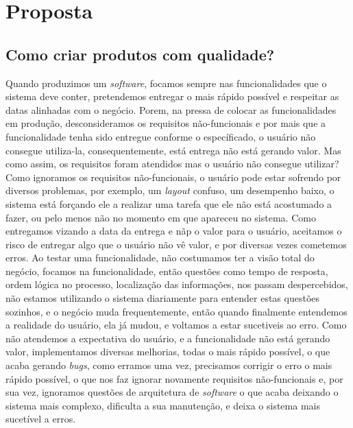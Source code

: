 \part{Proposta}
  \chapter{Como criar produtos com qualidade?}
    Quando produzimos um \textit{software}, focamos sempre nas funcionalidades que
    o sistema deve conter, pretendemos entregar o mais rápido possível e respeitar
    as datas alinhadas com o negócio. Porem, na pressa de colocar as funcionalidades
    em produção, desconsideramos os requisitos não-funcionais e por mais que a
    funcionalidade tenha sido entregue conforme o específicado, o usuário não
    consegue utiliza-la, consequentemente, está entrega não está gerando valor. \newline
    Mas como assim, os requisitos foram atendidos mas o usuário não consegue utilizar?
    Como ignoramos os requisitos não-funcionais, o usuário pode estar sofrendo por
    diversos problemas, por exemplo, um \textit{layout} confuso, um desempenho baixo,
    o sistema está forçando ele a realizar uma tarefa que ele não está acostumado a
    fazer, ou pelo menos não no momento em que apareceu no sistema. Como entregamos
    vizando a data da entrega e nãp o valor para o usuário, aceitamos o risco de
    entregar algo que o usuário não vê valor, e por diversas vezes cometemos erros.
    Ao testar uma funcionalidade, não costumamos ter a visão total do negócio,
    focamos na funcionalidade, então questões como tempo de resposta, ordem lógica
    no processo, localização das informações, nos passam despercebidos, não estamos
    utilizando o sistema diariamente para entender estas questões sozinhos, e o
    negócio muda frequentemente, então quando finalmente entendemos a realidade do
    usuário, ela já mudou, e voltamos a estar sucetiveis ao erro. \newline
    Como não atendemos a expectativa do usuário, e a funcionalidade não está gerando
    valor, implementamos diversas melhorias, todas o mais rápido possível, o que
    acaba gerando \textit{bugs}, como erramos uma vez, precisamos corrigir o erro
    o mais rápido possível, o que nos faz ignorar novamente requisitos não-funcionais
    e, por sua vez, ignoramos questões de arquitetura de \textit{software} o que
    acaba deixando o sistema mais complexo, dificulta a sua manutenção, e deixa o
    sistema mais sucetível a erros. \newline
